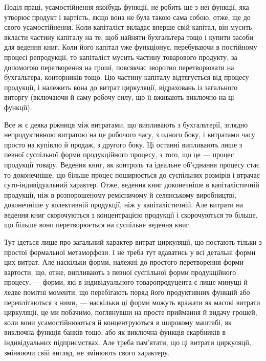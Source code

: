 Поділ праці, усамостійнення якоїбудь функції, не робить ще з неї
функції, яка утворює продукт і вартість, якщо вона не була такою сама
собою, отже, ще до свого усамостійнення. Коли капіталіст вкладає
вперше свій капітал, він мусить вкласти частину капіталу на те, щоб
найняти бухгальтера тощо і купити засоби для ведення книг. Коли його
капітал уже функціонує, перебуваючи в постійному процесі репродукції,
то капіталіст мусить частину товарового продукту, за допомогою перетворення
на гроші, повсякчас зворотно перетворювати на бухгальтера,
конторників тощо. Цю частину капіталу відтягується від процесу продукції,
і належить вона до витрат циркуляції, відраховань із загального
виторгу (включаючи й саму робочу силу, що її вживають виключно на
ці функції).

Все ж є деяка ріжниця між витратами, що випливають з бухгальтерії,
зглядно непродуктивною витратою на це робочого часу, з одного боку, і витратами
часу просто на купівлю й продаж, з другого боку. Ці останні випливають
лише з певної суспільної форми продукційного процесу, з того,
що це — процес продукції товару. Ведення книг, як контроль та ідеальне
об’єднання процесу стає то доконечніше, що більше процес поширюється
до суспільних розмірів і втрачає суто-індивідуальний характер.
Отже, ведення книг доконечніше в капіталістичній продукції, ніж
в розпорошеному ремісничому й селянському виробництві, доконечніше
у колективній продукції, ніж у капіталістичній. Але витрати на ведення
книг скорочуються з концентрацією продукції і скорочуються то більше,
що більше воно перетворюється на суспільне ведення книг.

Тут ідеться лише про загальний характер витрат циркуляції, що постають
тільки з простої формальної метаморфози. І не треба тут вдаватись у
всі детальні форми цих витрат. Але наскільки форми, належні
до простого перетворення форми вартости, що, отже, випливають з певної
суспільної форми продукційного процесу, — форми, які в індивідуального
товаропродуцента є лише минущі й ледве помітні
моменти, що перебігають поряд його продуктивних функцій
або переплітаються з ними, — наскільки ці
форми можуть вражати як масові витрати циркуляції, це ми побачимо,
поглянувши на просте приймання й
видачу грошей, коли вони усамостійнюються й концентруються в широкому маштабі,
як виключна функція банків тощо, або як виключна функція
скарбників в індивідуальних підприємствах. Але треба пам’ятати,
що ці витрати циркуляції, змінюючи свій вигляд, не змінюють свого характеру.

